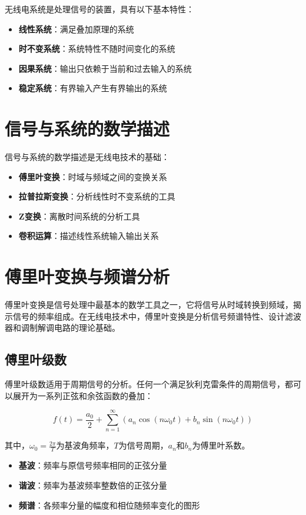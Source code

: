 \documentclass[12pt,UTF8]{ctexbook}
\begin{document}
无线电系统是处理信号的装置，具有以下基本特性：

\begin{itemize}[leftmargin=3.5em]
    \item \textbf{线性系统}：满足叠加原理的系统
    \item \textbf{时不变系统}：系统特性不随时间变化的系统
    \item \textbf{因果系统}：输出只依赖于当前和过去输入的系统
    \item \textbf{稳定系统}：有界输入产生有界输出的系统
\end{itemize}

\section{信号与系统的数学描述}

信号与系统的数学描述是无线电技术的基础：

\begin{itemize}[leftmargin=3.5em]
    \item \textbf{傅里叶变换}：时域与频域之间的变换关系
    \item \textbf{拉普拉斯变换}：分析线性时不变系统的工具
    \item \textbf{Z变换}：离散时间系统的分析工具
    \item \textbf{卷积运算}：描述线性系统输入输出关系
\end{itemize}

\section{傅里叶变换与频谱分析}

傅里叶变换是信号处理中最基本的数学工具之一，它将信号从时域转换到频域，揭示信号的频率组成。在无线电技术中，傅里叶变换是分析信号频谱特性、设计滤波器和调制解调电路的理论基础。

\subsection{傅里叶级数}

傅里叶级数适用于周期信号的分析。任何一个满足狄利克雷条件的周期信号，都可以展开为一系列正弦和余弦函数的叠加：

$$f(t) = \frac{a_0}{2} + \sum_{n=1}^{\infty}\left(a_n\cos(n\omega_0 t) + b_n\sin(n\omega_0 t)\right)$$

其中，$\omega_0 = \frac{2\pi}{T}$为基波角频率，$T$为信号周期，$a_n$和$b_n$为傅里叶系数。

\begin{itemize}[leftmargin=3.5em]
    \item \textbf{基波}：频率与原信号频率相同的正弦分量
    \item \textbf{谐波}：频率为基波频率整数倍的正弦分量
    \item \textbf{频谱}：各频率分量的幅度和相位随频率变化的图形
\end{itemize}
\end{document}
